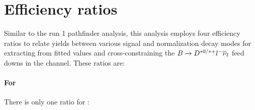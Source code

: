 \section{Efficiency ratios}
\label{ref:fit:eff}

Similar to the run 1 \RDX pathfinder analysis,
this analysis employs four efficiency ratios to relate yields between
various signal and normalization decay modes for extracting \RDX from fitted
values and cross-constraining the $B \rightarrow D^{*0/*+}{l^-}{{\overline{\nu}}_l}$ feed
downs in the \Dz channel.
These ratios are:

\paragraph{For \RD}
There is only one ratio for \RD:
